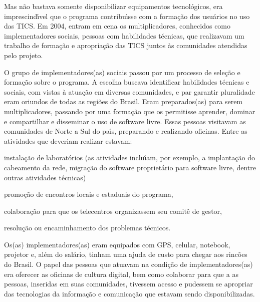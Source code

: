 \documentclass[
12pt,		%
openright,	%
twoside,  %
a4paper,			%
chapter=TITLE,		%
english,			%
french,				%
spanish,			%
brazil				%
]{USPSC-classe/USPSC}
\begin{document}
Mas n\~ao bastava somente disponibilizar equipamentos tecnol\'ogicos, era imprescind\'{\i}vel que o programa contribu\'{\i}sse com a forma\c{c}\~ao dos usu\'arios no uso das TICS. Em 2004, entram em cena os  multiplicadores, conhecidos como implementadores sociais,  pessoas com habilidades t\'ecnicas,  que realizavam um trabalho de forma\c{c}\~ao  e apropria\c{c}\~ao das TICS juntos \`as comunidades atendidas pelo projeto.














O grupo de implementadores(as) sociais  passou por um processo de sele\c{c}\~ao e forma\c{c}\~ao sobre o programa. A escolha buscava identificar habilidades t\'ecnicas e sociais, com vistas \`a atua\c{c}\~ao em diversas comunidades, e par garantir pluralidade eram oriundos de todas as regi\~oes do Brasil. Eram preparados(as) para serem multiplicadores, passando por uma forma\c{c}\~ao que os permitisse aprender, dominar e compartilhar e disseminar o uso de software livre. Essas pessoas visitavam as comunidades de Norte a Sul do pa\'{\i}s, preparando e realizando oficinas. Entre as atividades que deveriam realizar estavam:















\begin{alineas}
\item instala\c{c}\~ao de laborat\'orios (as atividades inclu\'{\i}am, por exemplo, a implanta\c{c}\~ao do cabeamento da rede, migra\c{c}\~ao do software propriet\'ario para software livre, dentre outras atividades t\'ecnicas)
\item promo\c{c}\~ao de encontros locais e estaduais do programa,
\item colabora\c{c}\~ao para que os telecentros organizassem seu  comit\^e de gestor,
\item resolu\c{c}\~ao ou encaminhamento dos problemas  t\'ecnicos.
\end{alineas}

Os(as) implementadores(as) eram equipados com GPS, celular, notebook, projetor  e, al\'em do sal\'ario, tinham uma ajuda de custo para chegar aos rinc\~oes do Brasil. O papel das pessoas que atuavam na condi\c{c}\~ao de implementadores(as) era oferecer as oficinas de cultura digital, bem como colaborar para que a as pessoas, inseridas em suas comunidades, tivessem acesso e pudessem se apropriar das tecnologias da informa\c{c}\~ao e comunica\c{c}\~ao que estavam sendo disponibilizadas.
\end{document}
